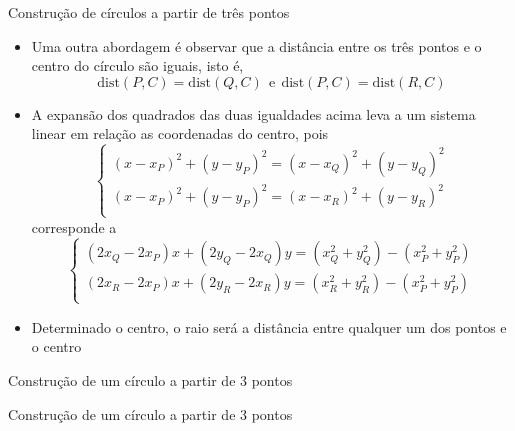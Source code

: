 \begin{frame}[fragile]{Construção de círculos a partir de três pontos}
    \begin{itemize}
        \item Uma outra abordagem é observar que a distância entre os três pontos e o centro do círculo são iguais, isto é, 
        \[\mathrm{dist}(P, C) = \mathrm{dist}(Q, C)\ \ \mbox{e}\ \ \mathrm{dist}(P, C) = \mathrm{dist}(R, C)
        \]
        \pause

        \item A expansão dos quadrados das duas igualdades acima leva a um sistema linear em 
            relação as coordenadas do centro, pois
        \[
            \left\lbrace \begin{array}{l}
                (x - x_P)^2 + (y - y_P)^2 = (x - x_Q)^2 + (y - y_Q)^2 \\
                (x - x_P)^2 + (y - y_P)^2 = (x - x_R)^2 + (y - y_R)^2 \\
            \end{array}
            \right.
        \]
        corresponde a
        \[
            \left\lbrace \begin{array}{l}
                (2x_Q - 2x_P)x + (2y_Q - 2x_Q)y = (x_Q^2 + y_Q^2) - (x_P^2 + y_P^2) \\
                (2x_R - 2x_P)x + (2y_R - 2x_R)y = (x_R^2 + y_R^2) - (x_P^2 + y_P^2) \\
            \end{array}
            \right.
        \]
        \pause

        \item Determinado o centro, o raio será a distância entre qualquer um dos pontos e o centro
    \end{itemize}

\end{frame}

\begin{frame}[fragile]{Construção de um círculo a partir de 3 pontos}
\end{frame}

\begin{frame}[fragile]{Construção de um círculo a partir de 3 pontos}
\end{frame}
